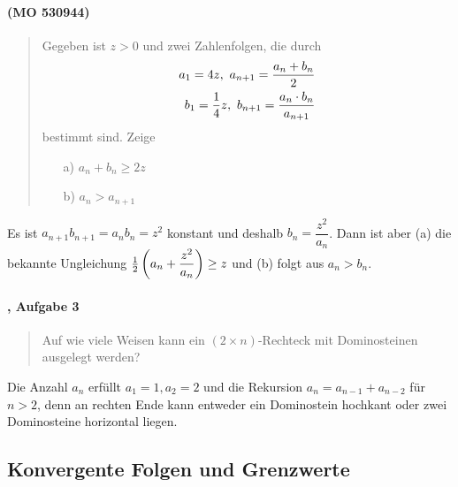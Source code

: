 \documentclass[11pt,a4paper]{article}
\begin{document}
\paragraph{(MO 530944)}
\begin{quote}
  Gegeben ist $z>0$ und zwei Zahlenfolgen, die durch
  \begin{align*}
    a_1=4z,\ a_{n+1}=\frac{a_n+b_n}{2}\\
    b_1=\frac14z,\ b_{n+1}=\frac{a_n\cdot b_n}{a_{n+1}}
  \end{align*}
  bestimmt sind. Zeige
  \begin{itemize}
  \item [a)] $a_n+b_n\ge 2z$
  \item [b)] $a_n>a_{n+1}$
  \end{itemize}
\end{quote}
\begin{loesung}
  Es ist $a_{n+1}b_{n+1}=a_nb_n=z^2$ konstant und deshalb
  $b_n=\dfrac{z^2}{a_n}$.  Dann ist aber (a) die bekannte Ungleichung
  $\frac12\left(a_n+\dfrac{z^2}{a_n}\right)\ge z$ und (b) folgt aus $a_n>b_n$. 
\end{loesung}

\paragraph{\cite{S}, Aufgabe 3}
\begin{quote}
  Auf wie viele Weisen kann ein $(2\times n)$-Rechteck mit Dominosteinen
  ausgelegt werden? 
\end{quote}
\begin{loesung}
  Die Anzahl $a_n$ erfüllt $a_1=1, a_2=2$ und die Rekursion
  $a_n=a_{n-1}+a_{n-2}$ für $n>2$, denn an rechten Ende kann entweder ein
  Dominostein hochkant oder zwei Dominosteine horizontal liegen. 
\end{loesung}

\subsection*{Konvergente Folgen und Grenzwerte}
\end{document}
